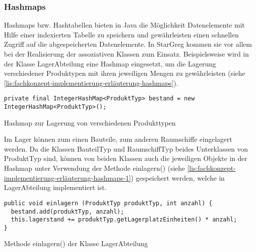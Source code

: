 \subsubsection{Hashmaps}
\label{subsub:fachkonzept-implementierung-erläuterung-hashmaps}

Hashmaps bzw. Hashtabellen bieten in Java die Möglichkeit Datenelemente mit Hilfe einer indexierten Tabelle zu speichern und gewährleisten einen schnellen Zugriff auf die abgespeicherten Datenelemente. In StarGreg kommen sie vor allem bei der Realisierung der assoziativen Klassen zum Einsatz. Beispielsweise wird in der Klasse LagerAbteilung eine Hashmap eingesetzt, um die Lagerung verschiedener Produktypen mit ihren jeweiligen Mengen zu gewährleisten (siehe \ref{lis:fachkonzept-implementierung-erläuterung-hashmaps}).

\begin{programm}[htb]
\begin{lstlisting}[breaklines=true]
private final IntegerHashMap<ProduktTyp> bestand = new IntegerHashMap<ProduktTyp>();
\end{lstlisting}
\caption{Hashmap zur Lagerung von verschiedenen Produkttypen\label{lis:fachkonzept-implementierung-erläuterung-hashmaps}}
\end{programm}

Im Lager können zum einen Bauteile, zum anderen Raumschiffe eingelagert werden. Da die Klassen BauteilTyp und RaumschiffTyp beides Unterklassen von ProduktTyp sind, können von beiden Klassen auch die jeweiligen Objekte in der Hashmap unter Verwendung der Methode einlagern() (siehe \ref{lis:fachkonzept-implementierung-erläuterung-hashmaps-1}) gespeichert werden, welche in LagerAbteilung implementiert ist.

\begin{programm}[htb]
\begin{lstlisting}[breaklines=true]
public void einlagern (ProduktTyp produktTyp, int anzahl) {
  bestand.add(produktTyp, anzahl);
  this.lagerstand += produktTyp.getLagerplatzEinheiten() * anzahl;
}
\end{lstlisting}
\caption{Methode einlagern() der Klasse LagerAbteilung\label{lis:fachkonzept-implementierung-erläuterung-hashmaps-1}}
\end{programm}
